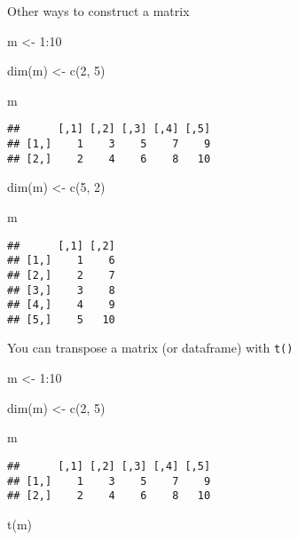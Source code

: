 \documentclass[
]{book}
\newenvironment{Shaded}{\begin{snugshade}}{\end{snugshade}}
\newcommand{\DecValTok}[1]{\textcolor[rgb]{0.00,0.00,0.81}{#1}}
\newcommand{\FunctionTok}[1]{\textcolor[rgb]{0.00,0.00,0.00}{#1}}
\newcommand{\NormalTok}[1]{#1}
\newcommand{\OtherTok}[1]{\textcolor[rgb]{0.56,0.35,0.01}{#1}}
\newcommand{\SpecialCharTok}[1]{\textcolor[rgb]{0.00,0.00,0.00}{#1}}
\begin{document}
Other ways to construct a matrix

\begin{Shaded}
\begin{Highlighting}[]
\NormalTok{m }\OtherTok{\textless{}{-}} \DecValTok{1}\SpecialCharTok{:}\DecValTok{10}

\FunctionTok{dim}\NormalTok{(m) }\OtherTok{\textless{}{-}} \FunctionTok{c}\NormalTok{(}\DecValTok{2}\NormalTok{, }\DecValTok{5}\NormalTok{)}

\NormalTok{m}
\end{Highlighting}
\end{Shaded}

\begin{verbatim}
##      [,1] [,2] [,3] [,4] [,5]
## [1,]    1    3    5    7    9
## [2,]    2    4    6    8   10
\end{verbatim}

\begin{Shaded}
\begin{Highlighting}[]
\FunctionTok{dim}\NormalTok{(m) }\OtherTok{\textless{}{-}} \FunctionTok{c}\NormalTok{(}\DecValTok{5}\NormalTok{, }\DecValTok{2}\NormalTok{)}

\NormalTok{m}
\end{Highlighting}
\end{Shaded}

\begin{verbatim}
##      [,1] [,2]
## [1,]    1    6
## [2,]    2    7
## [3,]    3    8
## [4,]    4    9
## [5,]    5   10
\end{verbatim}

You can transpose a matrix (or dataframe) with \texttt{t()}

\begin{Shaded}
\begin{Highlighting}[]
\NormalTok{m }\OtherTok{\textless{}{-}} \DecValTok{1}\SpecialCharTok{:}\DecValTok{10}

\FunctionTok{dim}\NormalTok{(m) }\OtherTok{\textless{}{-}} \FunctionTok{c}\NormalTok{(}\DecValTok{2}\NormalTok{, }\DecValTok{5}\NormalTok{)}

\NormalTok{m}
\end{Highlighting}
\end{Shaded}

\begin{verbatim}
##      [,1] [,2] [,3] [,4] [,5]
## [1,]    1    3    5    7    9
## [2,]    2    4    6    8   10
\end{verbatim}

\begin{Shaded}
\begin{Highlighting}[]
\FunctionTok{t}\NormalTok{(m)}
\end{Highlighting}
\end{Shaded}
\end{document}
